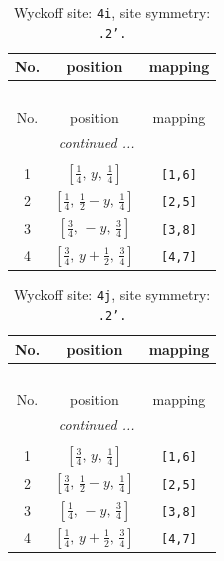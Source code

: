 \documentclass[fleqn,8pt]{jsarticle}
\begin{document}
\renewcommand{\arraystretch}{1.2}
\begin{longtable}{ccc}
\caption{Wyckoff site: {\tt 4i}, site symmetry: {\tt .2'.}}
 \\
 \hline \hline
No. & position & mapping \\ \hline \endfirsthead

\multicolumn{2}{l}{\tablename\ \thetable{}} \\
 \hline \hline
No. & position & mapping \\ \hline \endhead

 \hline \hline
\multicolumn{2}{r}{\footnotesize\it continued ...} \\ \endfoot

 \hline \hline
\multicolumn{2}{r}{} \\ \endlastfoot

1 & $\left[ \frac{1}{4},\, y,\, \frac{1}{4} \right]$ & {\tt [1,6]} \\ \hline
2 & $\left[ \frac{1}{4},\, \frac{1}{2} - y,\, \frac{1}{4} \right]$ & {\tt [2,5]} \\ \hline
3 & $\left[ \frac{3}{4},\, - y,\, \frac{3}{4} \right]$ & {\tt [3,8]} \\ \hline
4 & $\left[ \frac{3}{4},\, y + \frac{1}{2},\, \frac{3}{4} \right]$ & {\tt [4,7]} \\
\end{longtable}
\renewcommand{\arraystretch}{1.2}
\begin{longtable}{ccc}
\caption{Wyckoff site: {\tt 4j}, site symmetry: {\tt .2'.}}
 \\
 \hline \hline
No. & position & mapping \\ \hline \endfirsthead

\multicolumn{2}{l}{\tablename\ \thetable{}} \\
 \hline \hline
No. & position & mapping \\ \hline \endhead

 \hline \hline
\multicolumn{2}{r}{\footnotesize\it continued ...} \\ \endfoot

 \hline \hline
\multicolumn{2}{r}{} \\ \endlastfoot

1 & $\left[ \frac{3}{4},\, y,\, \frac{1}{4} \right]$ & {\tt [1,6]} \\ \hline
2 & $\left[ \frac{3}{4},\, \frac{1}{2} - y,\, \frac{1}{4} \right]$ & {\tt [2,5]} \\ \hline
3 & $\left[ \frac{1}{4},\, - y,\, \frac{3}{4} \right]$ & {\tt [3,8]} \\ \hline
4 & $\left[ \frac{1}{4},\, y + \frac{1}{2},\, \frac{3}{4} \right]$ & {\tt [4,7]} \\
\end{longtable}
\end{document}
